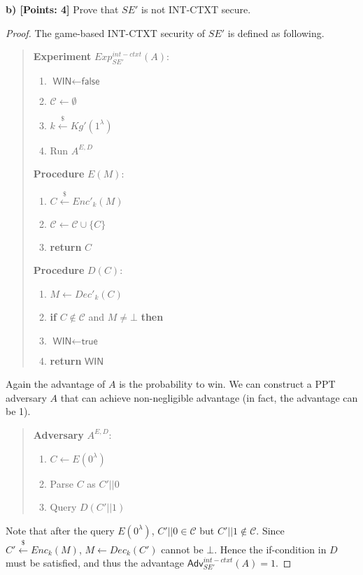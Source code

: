 \documentclass[12pt]{article}
\newcommand{\getsr}{\stackrel{\$}{\gets}}
\newcommand{\Adv}{\textsf{Adv}}
\newcommand{\tab}{\hspace{0.3in}}
\newcommand{\WIN}{\textsf{WIN}}
\newcommand{\true}{\textsf{true}}
\newcommand{\false}{\textsf{false}}
\newcommand{\C}{\mathcal{C}}
\theoremstyle{definition}
\begin{document}
{\bf b) [Points: 4]} Prove that $SE'$ is not INT-CTXT secure.
\begin{proof}
The game-based INT-CTXT security of $SE'$ is defined as following.
\begin{quote}
\begin{minipage}[t]{0.35\textwidth}
{\bf Experiment} $Exp_{SE'}^{int-ctxt}(A)$:
\begin{enumerate}
\item $\WIN \gets \false$
\item $\C \gets \emptyset$
\item $k \getsr Kg'(1^\lambda)$
\item Run $A^{E,D}$
\end{enumerate}
\end{minipage}
\begin{minipage}[t]{0.5\textwidth}
{\bf Procedure} $E(M)$:
\begin{enumerate}
\item $C \getsr Enc'_k(M)$
\item $\C \gets \C \cup \{C\}$
\item {\bf return} $C$
\end{enumerate}
\end{minipage}

\begin{minipage}[t]{0.5\textwidth}
{\bf Procedure} $D(C)$:
\begin{enumerate}
\item $M \gets Dec'_k(C)$
\item {\bf if} $C \not\in \C$ and $M \not=\bot$ {\bf then}
\item \tab $\WIN \gets \true$
\item {\bf return} $\WIN$
\end{enumerate}
\end{minipage}
\end{quote}
Again the advantage of $A$ is the probability to win. We can construct a PPT adversary $A$ that can achieve non-negligible advantage (in fact, the advantage can be 1).
\begin{quote}
{\bf Adversary} $A^{E,D}$:
\begin{enumerate}
\item $C \gets E(0^\lambda)$
\item Parse $C$ as $C'||0$
\item Query $D(C'||1)$
\end{enumerate}
\end{quote}
Note that after the query $E(0^\lambda)$, $C'||0 \in \C$ but $C'||1 \not\in \C$. Since $C' \getsr Enc_k(M)$, $M \gets Dec_k(C')$ cannot be $\bot$. Hence the if-condition in $D$ must be satisfied, and thus the advantage $\Adv_{SE'}^{int-ctxt}(A) = 1$.
\end{proof}
\end{document}

